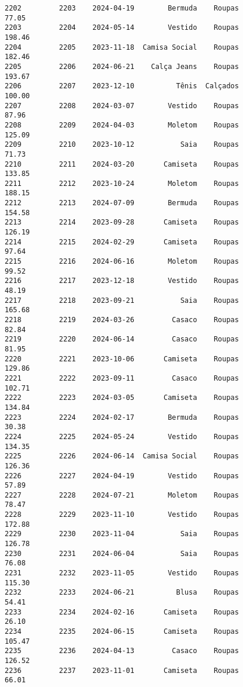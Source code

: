 \documentclass[11pt]{article}
\begin{document}
\begin{Verbatim}[commandchars=\\\{\}]
2202         2203    2024-04-19        Bermuda    Roupas           77.05   
2203         2204    2024-05-14        Vestido    Roupas          198.46   
2204         2205    2023-11-18  Camisa Social    Roupas          182.46   
2205         2206    2024-06-21    Calça Jeans    Roupas          193.67   
2206         2207    2023-12-10          Tênis  Calçados          100.00   
2207         2208    2024-03-07        Vestido    Roupas           87.96   
2208         2209    2024-04-03        Moletom    Roupas          125.09   
2209         2210    2023-10-12           Saia    Roupas           71.73   
2210         2211    2024-03-20       Camiseta    Roupas          133.85   
2211         2212    2023-10-24        Moletom    Roupas          188.15   
2212         2213    2024-07-09        Bermuda    Roupas          154.58   
2213         2214    2023-09-28       Camiseta    Roupas          126.19   
2214         2215    2024-02-29       Camiseta    Roupas           97.64   
2215         2216    2024-06-16        Moletom    Roupas           99.52   
2216         2217    2023-12-18        Vestido    Roupas           48.19   
2217         2218    2023-09-21           Saia    Roupas          165.68   
2218         2219    2024-03-26         Casaco    Roupas           82.84   
2219         2220    2024-06-14         Casaco    Roupas           81.95   
2220         2221    2023-10-06       Camiseta    Roupas          129.86   
2221         2222    2023-09-11         Casaco    Roupas          102.71   
2222         2223    2024-03-05       Camiseta    Roupas          134.84   
2223         2224    2024-02-17        Bermuda    Roupas           30.38   
2224         2225    2024-05-24        Vestido    Roupas          134.35   
2225         2226    2024-06-14  Camisa Social    Roupas          126.36   
2226         2227    2024-04-19        Vestido    Roupas           57.89   
2227         2228    2024-07-21        Moletom    Roupas           78.47   
2228         2229    2023-11-10        Vestido    Roupas          172.88   
2229         2230    2023-11-04           Saia    Roupas          126.78   
2230         2231    2024-06-04           Saia    Roupas           76.08   
2231         2232    2023-11-05        Vestido    Roupas          115.30   
2232         2233    2024-06-21          Blusa    Roupas           54.41   
2233         2234    2024-02-16       Camiseta    Roupas           26.10   
2234         2235    2024-06-15       Camiseta    Roupas          105.47   
2235         2236    2024-04-13         Casaco    Roupas          126.52   
2236         2237    2023-11-01       Camiseta    Roupas           66.01   

\end{Verbatim}
\end{document}
